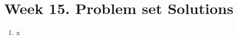 \documentclass{article}
\begin{document}


\raggedright

\section*{Week 15. Problem set Solutions}
\begin{enumerate}
    \item x
\end{enumerate}
\end{document}
